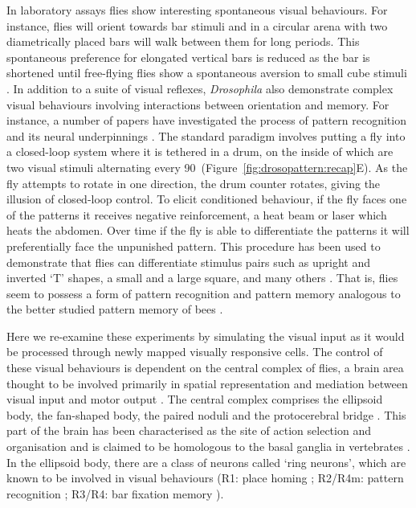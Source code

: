 In laboratory assays flies show interesting spontaneous visual behaviours. For instance, flies will orient towards bar stimuli \cite{Reichardt1969,Gotz1987} and in a circular arena with two diametrically placed bars will walk between them for long periods. This spontaneous preference for elongated vertical bars is reduced as the bar is shortened until free-flying flies show a spontaneous aversion to small cube stimuli \cite{Maimon2008}. In addition to a suite of visual reflexes, \emph{Drosophila} also demonstrate complex visual behaviours involving interactions between orientation and memory.
For instance, a number of papers have investigated the process of pattern recognition and its neural underpinnings \cite{Ernst1999,Liu2006,Pan2009}.
The standard paradigm involves putting a fly into a closed-loop system where it is tethered in a drum, on the inside of which are two visual stimuli alternating every 90\degree\ (Figure~\ref{fig:drosopattern:recap}E). As the fly attempts to rotate in one direction, the drum counter rotates, giving the illusion of closed-loop control. To elicit conditioned behaviour, if the fly faces one of the patterns it receives negative reinforcement, a heat beam or laser which heats the abdomen. Over time if the fly is able to differentiate the patterns it will preferentially face the unpunished pattern. This procedure has been used to demonstrate that flies can differentiate stimulus pairs such as upright and inverted `T' shapes, a small and a large square, and many others \cite{Ernst1999}. That is, flies seem to possess a form of pattern recognition and pattern memory analogous to the better studied pattern memory of bees \cite{vonFrisch1914,Giurfa1997,Horridge2009}.

Here we re-examine these experiments by simulating the visual input as it would be processed through newly mapped visually responsive cells. The control of these visual behaviours is dependent on the central complex of flies, a brain area thought to be involved primarily in spatial representation and mediation between visual input and motor output \cite{Pfeiffer2014}.
The central complex comprises the ellipsoid body, the fan-shaped body, the paired noduli and the protocerebral bridge \cite{Young2010}.
This part of the brain has been characterised as the site of action selection and organisation and is claimed to be homologous to the basal ganglia in vertebrates \cite{Strausfeld2013}.
In the ellipsoid body, there are a class of neurons called `ring neurons', which are known to be involved in visual behaviours (R1: place homing \cite{Sitaraman2008,Sitaraman2010,Ofstad2011}; R2/R4m: pattern recognition \cite{Ernst1999,Liu2006,Pan2009}; R3/R4: bar fixation memory \cite{Neuser2008}).

